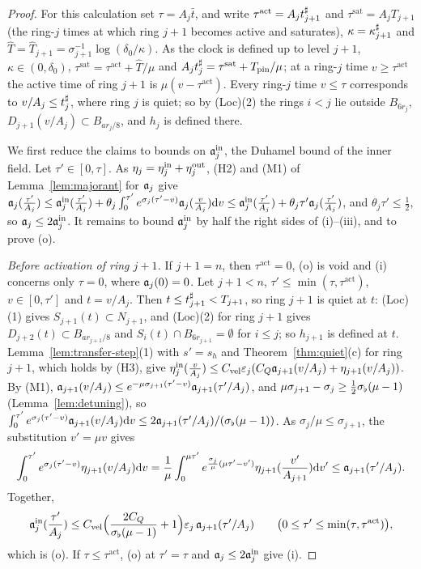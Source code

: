 \begin{proof}
For this calculation set $\tau=A_j\bar t$, and write $\tau^{\mathrm{act}}=A_jt^\sharp_{j+1}$ and $\tau^{\mathrm{sat}}=A_jT_{j+1}$
(the ring-$j$ times at which ring $j+1$ becomes active and saturates),
$\kappa=\kappa^\sharp_{j+1}$ and $\hat T=\hat T_{j+1}=\sigma_{j+1}^{-1}\log(\delta_0/\kappa)$.
As the clock is defined up to level $j+1$, $\kappa\in(0,\delta_0)$,
$\tau^{\mathrm{sat}}=\tau^{\mathrm{act}}+\hat T/\mu$ and
$A_jt^\sharp_j=\tau^{\mathrm{sat}}+T_{\mathrm{pin}}/\mu$; at a ring-$j$ time $v\ge\tau^{\mathrm{act}}$
the active time of ring $j+1$ is $\mu(v-\tau^{\mathrm{act}})$. Every ring-$j$ time
$v\le\tau$ corresponds to $v/A_j\le t^\sharp_j$, where ring $j$ is quiet; so by
(Loc)(2) the rings $i<j$ lie outside $B_{6r_j}$, $D_{j+1}(v/A_j)\subset B_{ar_j/8}$,
and $h_j$ is defined there.

We first reduce the claims to bounds on $\mathfrak{a}^{\mathrm{in}}_j$, the Duhamel bound of
the inner field. Let $\tau'\in[0,\tau]$. As $\eta_j=\eta^{\mathrm{in}}_j+\eta^{\mathrm{out}}_j$, (H2) and (M1) of
Lemma~\ref{lem:majorant} for $\mathfrak{a}_j$ give
$\mathfrak{a}_j(\frac{\tau'}{A_j})\le\mathfrak{a}^{\mathrm{in}}_j(\frac{\tau'}{A_j})+\theta_j\int_0^{\tau'}e^{\sigma_j(\tau'-v)}\mathfrak{a}_j(\frac{v}{A_j})\dd v
\le\mathfrak{a}^{\mathrm{in}}_j(\frac{\tau'}{A_j})+\theta_j\tau'\mathfrak{a}_j(\frac{\tau'}{A_j})$,
and $\theta_j\tau'\le\frac12$, so $\mathfrak{a}_j\le2\mathfrak{a}^{\mathrm{in}}_j$. It remains to
bound $\mathfrak{a}^{\mathrm{in}}_j$ by half the right sides of (i)--(iii), and to prove (o).

\emph{Before activation of ring $j+1$.} If $j+1=n$, then $\tau^{\mathrm{act}}=0$, (o) is
void and (i) concerns only $\tau=0$, where $\mathfrak{a}_j(0)=0$. Let $j+1<n$,
$\tau'\le\min(\tau,\tau^{\mathrm{act}})$, $v\in[0,\tau']$ and $t=v/A_j$. Then
$t\le t^\sharp_{j+1}<T_{j+1}$, so ring $j+1$ is quiet at $t$: (Loc)(1) gives
$S_{j+1}(t)\subset N_{j+1}$, and (Loc)(2) for ring $j+1$ gives
$D_{j+2}(t)\subset B_{ar_{j+1}/8}$ and $S_i(t)\cap B_{6r_{j+1}}=\emptyset$ for $i\le j$;
so $h_{j+1}$ is defined at $t$. Lemma~\ref{lem:transfer-step}(1) with $s'=s_h$
and Theorem~\ref{thm:quiet}(c) for ring $j+1$, which holds by (H3), give
$\eta^{\mathrm{in}}_j(\frac{v}{A_j})\le C_{\mathrm{vel}} \varepsilon_j(C_Q\mathfrak{a}_{j+1}(v/A_j)+\eta_{j+1}(v/A_j))$. By (M1),
$\mathfrak{a}_{j+1}(v/A_j)\le e^{-\mu\sigma_{j+1}(\tau'-v)}\mathfrak{a}_{j+1}(\tau'/A_j)$, and
$\mu\sigma_{j+1}-\sigma_j\ge\frac12\sigma_\flat(\mu-1)$ (Lemma~\ref{lem:detuning}), so
$\int_0^{\tau'}e^{\sigma_j(\tau'-v)}\mathfrak{a}_{j+1}(v/A_j)\dd v\le2\mathfrak{a}_{j+1}(\tau'/A_j)/(\sigma_\flat(\mu-1))$.
As $\sigma_j/\mu\le\sigma_{j+1}$, the substitution $v'=\mu v$ gives
\[
\int_0^{\tau'}e^{\sigma_j(\tau'-v)}\eta_{j+1}(v/A_j)\dd v=\frac1\mu\int_0^{\mu\tau'}e^{\frac{\sigma_j}\mu(\mu\tau'-v')}\eta_{j+1}(\frac{v'}{A_{j+1}})\dd v'\le\mathfrak{a}_{j+1}(\tau'/A_j) .
\]
Together,
\begin{equation}
\label{eq:relay-quiet}
\mathfrak{a}^{\mathrm{in}}_j(\frac{\tau'}{A_j})\le C_{\mathrm{vel}} \Big(\frac{2C_Q}{\sigma_\flat(\mu-1)}+1\Big)\varepsilon_j\,\mathfrak{a}_{j+1}(\tau'/A_j)\qquad\big(0\le\tau'\le\min(\tau,\tau^{\mathrm{act}})\big),
\end{equation}
which is (o). If $\tau\le\tau^{\mathrm{act}}$, (o) at $\tau'=\tau$ and $\mathfrak{a}_j\le2\mathfrak{a}^{\mathrm{in}}_j$
give (i).


\end{proof}
